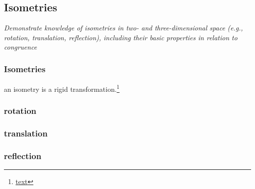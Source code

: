 \subsection[isometries]{Isometries}


\textit{Demonstrate knowledge of isometries in two- and three-dimensional space (e.g., rotation, translation, reflection), including their basic properties in relation to congruence}

\subsubsection*{Isometries}

an isometry is a rigid transformation.\footnote{\href{https://calcworkshop.com/transformations/isometry/}{text}}

\subsubsection[rotation]{rotation}

\subsubsection[translation]{translation}

\subsubsection[reflection]{reflection}


 
